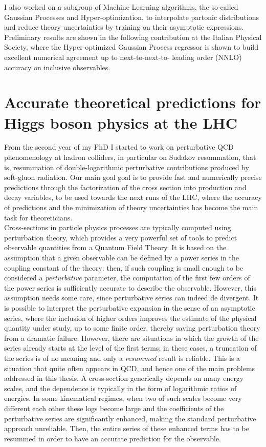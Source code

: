 \documentclass[12pt]{article}
\begin{document}
I also worked on a subgroup of Machine Learning algorithms, the so-called Gaussian Processes and Hyper-optimization, to interpolate partonic distributions and reduce theory uncertainties by training on their asymptotic expressions. Preliminary results are shown in the following contribution at the Italian Physical Society, where the Hyper-optimized Gaussian Process regressor is shown to build excellent numerical agreement up to next-to-next-to- leading order (NNLO) accuracy on inclusive observables.

\section{Accurate theoretical predictions for Higgs boson physics at the LHC}
From the second year of my PhD I started to work on perturbative QCD phenomenology at hadron colliders, in particular on Sudakov resummation, that is, resummation of double-logarithmic perturbative contributions produced by soft-gluon radiation. Our main goal goal is to provide fast and numerically precise predictions through the factorization of the cross section into production and decay variables, to be used towards the next runs of the LHC, where the accuracy of predictions and the minimization of theory uncertainties has become the main task for theoreticians.\\

Cross-sections in particle physics processes are typically computed using perturbation theory, which provides a very powerful set of tools to predict observable quantities from a Quantum Field Theory. It is based on the assumption that a given observable can be defined by a power series in the coupling constant of the theory: then, if such coupling is small enough to be considered a \textit{perturbative} parameter, the computation of the first few orders of the power series is sufficiently accurate to describe the observable. However, this assumption needs some care, since perturbative series can indeed de divergent. It is possible to interpret the perturbative expansion in the sense of an asymptotic series, where the inclusion of higher orders improves the estimate of the physical quantity under study, up to some finite order, thereby saving perturbation theory from a dramatic failure. However, there are situations in which the growth of the series already starts at the level of the first terms; in these cases, a truncation of the series is of no meaning and only a \textit{resummed} result is reliable. This is a situation that quite often appears in QCD, and hence one of the main problems addressed in this thesis. A cross-section generically depends on many energy scales, and the dependence is typically in the form of logarithmic ratios of energies. In some kinematical regimes, when two of such scales become very different each other these logs become large and the coefficients of the perturbative series are significantly enhanced, making the standard perturbative approach unreliable. Then, the entire series of these enhanced terms has to be resummed in order to have an accurate prediction for the observable.\\
\end{document}
